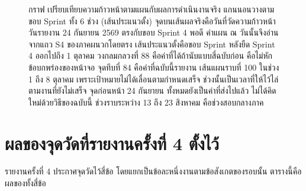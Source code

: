 \begin{figure}[H]
\caption{กราฟ เปรียบเทียบความก้าวหน้าตามแผนกับผลการดำเนินงานจริง
 แกนนอนวางตามขอบ Sprint ทั้ง 6 ช่วง (เส้นประแนวตั้ง)
 จุดบนเส้นผลจริงคือวันที่วัดความก้าวหน้า
 วันรายงาน 24 กันยายน 2569 ตรงกับขอบ Sprint 4 พอดี
 ค่าแผน ณ วันนั้นจึงอ่านจากแถว S4 ของภาคผนวกโดยตรง
 เส้นประแนวตั้งคือขอบ Sprint หลังยืด Sprint 4 ออกไปถึง 1 ตุลาคม
 วงกลมกลวงที่ 88 คือค่าที่ได้ถ้านับแบบสี่ฉบับก่อน คือไม่หักข้อบกพร่องของหน้าจอ
 จุดทึบที่ 84 คือค่าที่ฉบับนี้รายงาน
 เส้นแผนราบที่ 100 ในช่วง 1 ถึง 8 ตุลาคม เพราะเป้าหมายไม่ได้เลื่อนตามกำหนดเสร็จ
 ช่วงนั้นเป็นเวลาที่ให้ไว้ไล่ตามงานที่ยังไม่เสร็จ
 จุดก่อนหน้า 24 กันยายน ทั้งหมดยังเป็นค่าที่ส่งไปแล้ว ไม่ได้คิดใหม่ด้วยวิธีของฉบับนี้
 ช่วงราบระหว่าง 13 ถึง 23 สิงหาคม คือช่วงสอบกลางภาค}
\label{fig:scurve}
\end{figure}

\clearpage
\section{ผลของจุดวัดที่รายงานครั้งที่ 4 ตั้งไว้}
\label{sec:review}

รายงานครั้งที่ 4 ประกาศจุดวัดไว้สี่ข้อ โดยแยกเป็นข้อละหนึ่งงานตามข้อสังเกตของรอบนั้น ตารางนี้คือผลของทั้งสี่ข้อ


